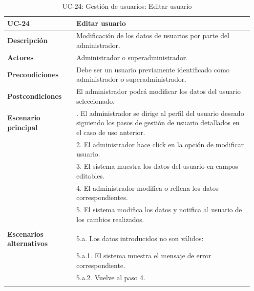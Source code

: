 \begin{table}
  \begin{center}
    \begin{tabularx}{16.4cm}{|l|X|}
      \hline
      \textbf{UC-24} & \textbf{Editar usuario}\\
      \hline
      \textbf{Descripción} & Modificación de los datos de usuarios por parte del administrador.\\
      \hline
      \textbf{Actores} & Administrador o superadministrador.\\
      \hline
      \textbf{Precondiciones} & Debe ser un usuario previamente identificado como administrador o superadministrador.\\
      \hline
      \textbf{Postcondiciones} & El administrador podrá modificar los datos del usuario seleccionado.\\
      \hline
      \textbf{Escenario principal} & \smallskip 1. El administrador se dirige al perfil del usuario deseado siguiendo los pasos de gestión de usuario detallados en el caso de uso anterior.\\
      & 2. El administrador hace click en la opción de modificar usuario. \\
      & 3. El sistema muestra los datos del usuario en campos editables.\\
      & 4. El administrador modifica o rellena los datos correspondientes.\\
      & 5. El sistema modifica los datos y notifica al usuario de los cambios realizados.\\ 
      & \\
      \hline
      \textbf{Escenarios alternativos} & \smallskip 5.a. Los datos introducidos no son válidos:\\
      & \hspace{0.3cm} 5.a.1. El sistema muestra el mensaje de error correspondiente.\\
      & \hspace{0.3cm} 5.a.2. Vuelve al paso 4.\\
      & \\
      \hline
    \end{tabularx}
    \caption{UC-24: Gestión de usuarios: Editar usuario}
    \label{tab:CU-editar-usuario-admin}
  \end{center}
\end{table}


